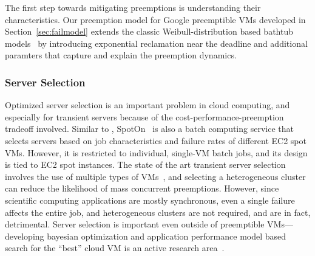 The first step towards mitigating preemptions is understanding their characteristics. 
Our preemption model for Google preemptible VMs developed in Section~\ref{sec:failmodel} extends the classic Weibull-distribution based bathtub models~\cite{Crevecour} by introducing exponential reclamation near the deadline and additional paramters that capture and explain the preemption dynamics. 


\subsubsection{Server Selection}

Optimized server selection is an important problem in cloud computing, and especially for transient servers because of the cost-performance-preemption tradeoff involved. 
Similar to \sysname, SpotOn~\cite{spoton} is also a batch computing service that selects servers based on job characteristics and failure rates of different EC2 spot VMs. However, it is restricted to individual, single-VM batch jobs, and its design is tied to EC2 spot instances.
The state of the art transient server selection involves the use of multiple types of VMs~\cite{exosphere}, and selecting a heterogeneous cluster can reduce the likelihood of mass concurrent preemptions.
However, since scientific computing applications are mostly synchronous, even a single failure affects the entire job, and heterogeneous clusters are not required, and are in fact, detrimental. 
Server selection is important even outside of preemptible VMs---developing bayesian optimization and application performance model based search for the ``best'' cloud VM is an active research area~\cite{alipourfard_cherrypick, yadwadkar_selecting_2017}. 











